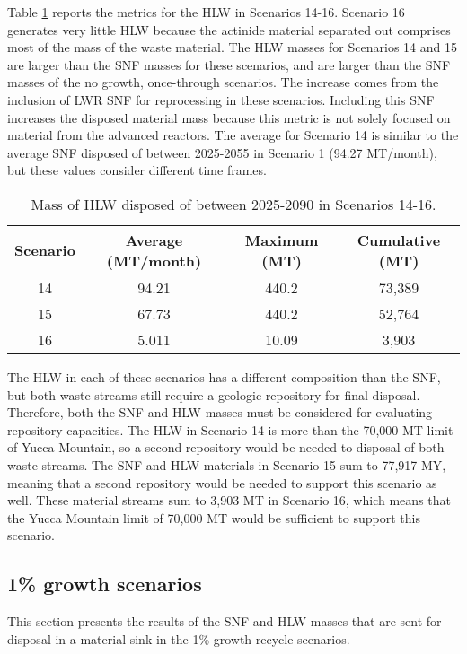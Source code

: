 Table \ref{tab:s14-16_hlw} reports the metrics for the \gls{HLW} 
in Scenarios 14-16. Scenario 16 generates very little 
\gls{HLW} because the actinide material separated out 
comprises most of the mass of the waste material. The \gls{HLW} 
masses for Scenarios 14 and 15 are larger than the \gls{SNF} 
masses for these scenarios, and are larger than the \gls{SNF} 
masses of the no growth, once-through scenarios. The increase 
comes from the inclusion of \gls{LWR} \gls{SNF} for reprocessing 
in these scenarios. Including this \gls{SNF} increases the 
disposed material mass because this metric is not solely focused 
on material from the advanced reactors. The average for 
Scenario 14 is similar to the average \gls{SNF} disposed of 
between 2025-2055 in Scenario 1 (94.27 MT/month), but these 
values consider different time frames. 

\begin{table}[h!]
    \centering 
    \caption{Mass of HLW disposed of between 2025-2090 in 
    Scenarios 14-16.}
    \label{tab:s14-16_hlw}
    \begin{tabular}{c c c c}
        \hline 
        Scenario & Average (MT/month) & Maximum (MT) & Cumulative (MT) \\
        \hline
        14 & 94.21 & 440.2 & 73,389\\
        15 & 67.73 & 440.2 & 52,764\\
        16 & 5.011 & 10.09 & 3,903\\
        \hline
    \end{tabular}
\end{table}

The \gls{HLW} in each of these scenarios has a different 
composition than the \gls{SNF}, but both waste streams 
still require a geologic repository for final 
disposal. Therefore, both the \gls{SNF} and \gls{HLW} 
masses must be considered for evaluating repository 
capacities. The \gls{HLW} in Scenario 14 is more than 
the 70,000 MT limit of Yucca Mountain, so a second 
repository would be needed to disposal of both waste 
streams. The \gls{SNF} and \gls{HLW} materials in 
Scenario 15 sum to 77,917 MY, meaning that a second 
repository would be needed to support this scenario 
as well. These material streams sum to 3,903 MT in 
Scenario 16, which means that the Yucca Mountain 
limit of 70,000 MT would be sufficient to support this 
scenario. 


\subsection{1\% growth scenarios}
This section presents the results of the \gls{SNF} and 
\gls{HLW} masses that are sent for disposal in a 
material sink in the 1\% growth recycle scenarios. 
